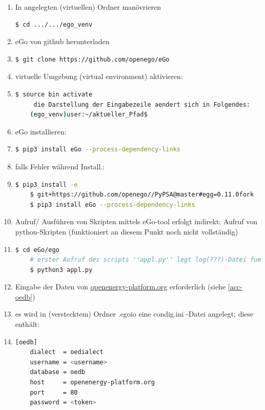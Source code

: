 \documentclass[
a4paper,     %
12pt         %
]{scrartcl}  %
\begin{document}
\begin{enumerate}
	\item In angelegten (virtuellen) Ordner manövrieren \begin{lstlisting}[language=bash]
	$ cd .../.../ego_venv
	\end{lstlisting}
	\item eGo von github herunterladen
	\item[] \begin{lstlisting}[language=bash]
	$ git clone https://github.com/openego/eGo
	\end{lstlisting}

	\item virtuelle Umgebung (virtual environment) aktivieren:

	\item[] \begin{lstlisting}[language=bash]
	$ source bin activate
	 die Darstellung der Eingabezeile aendert sich in Folgendes:
	(ego_venv)user:~/aktueller_Pfad$
	\end{lstlisting}

	\item eGo installieren:
	\item[] \begin{lstlisting}[language=bash]
	$ pip3 install eGo --process-dependency-links
	\end{lstlisting}
	\item[] falls Fehler während Install.:
	\item[] \begin{lstlisting}[language=bash]
	$ pip3 install -e
	$ git+https://github.com/openego//PyPSA@master#egg=0.11.0fork
	$ pip3 install eGo --process-dependency-links
	\end{lstlisting}

	\item Aufruf/ Ausführen von Skripten mittels eGo-tool erfolgt indirekt; Aufruf von python-Skripten (funktioniert an diesem Punkt noch nicht vollständig)
	\item[] \begin{lstlisting}[language=bash]
	$ cd eGo/ego
	# erster Aufruf des scripts ''appl.py'' legt log(???)-Datei fuer oedb-Anmeldung an
	$ python3 appl.py
	\end{lstlisting}
	\item Eingabe der Daten von \url{openenergy-platform.org} erforderlich (siehe \ref{acc-oedb})
	\item[] es wird in (verstecktem) Ordner \glqq .egoio  \grqq eine \glqq condig.ini  \grqq -Datei angelegt; diese enthält:
	\item[] \begin{lstlisting}[language=bash]
	[oedb]
	dialect  = oedialect
	username = <username>
	database = oedb
	host     = openenergy-platform.org
	port     = 80
	password = <token>
	\end{lstlisting}



\end{enumerate}
\end{document}
